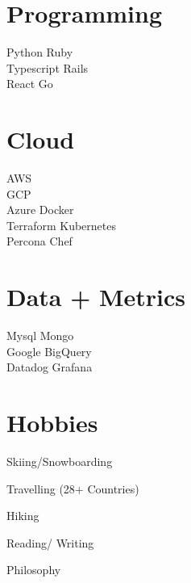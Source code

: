 \documentclass[]{deedy-resume-openfont}
\begin{document}
\begin{minipage}[t]{0.25\textwidth}
\section{Programming}

\textbullet{} Python \textbullet{} Ruby \\ \textbullet{} Typescript
\textbullet{} Rails \\
\textbullet{} React \textbullet{} Go \\ 
\sectionsep

\section{Cloud }
\textbullet{} AWS  \\
\textbullet{} GCP  \\
\textbullet{} Azure   \textbullet{} Docker  \\
 \textbullet{} Terraform   \textbullet{} Kubernetes  \\
 \textbullet{} Percona   \textbullet{} Chef \\ 
\sectionsep

\section{Data + Metrics }
\textbullet{} Mysql \textbullet{} Mongo \\
\textbullet{} Google BigQuery  \\
 \textbullet{} Datadog   \textbullet{} Grafana 
 
\sectionsep

\section{Hobbies}

\textbullet{} Skiing/Snowboarding

\textbullet{} Travelling (28+ Countries)

\textbullet{} Hiking

\textbullet{} Reading/ Writing

\textbullet{} Philosophy
\sectionsep


%
%

\end{minipage}
\hfill
\end{document}
